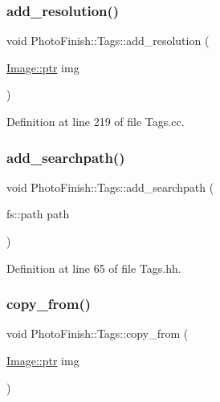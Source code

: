 \subsubsection{\texorpdfstring{add\+\_\+resolution()}{add\_resolution()}}
{\footnotesize\ttfamily void Photo\+Finish\+::\+Tags\+::add\+\_\+resolution (\begin{DoxyParamCaption}\item[{\hyperlink{class_photo_finish_1_1_image_ab336203305ed3a1397d7245063353b5a}{Image\+::ptr}}]{img }\end{DoxyParamCaption})}



Definition at line 219 of file Tags.\+cc.

\mbox{\label{class_photo_finish_1_1_tags_a643e1af1ed57a5cd8ad483ccbed1c190}} 
\subsubsection{\texorpdfstring{add\+\_\+searchpath()}{add\_searchpath()}}
{\footnotesize\ttfamily void Photo\+Finish\+::\+Tags\+::add\+\_\+searchpath (\begin{DoxyParamCaption}\item[{fs\+::path}]{path }\end{DoxyParamCaption})\hspace{0.3cm}{\ttfamily [inline]}}



Definition at line 65 of file Tags.\+hh.

\mbox{\label{class_photo_finish_1_1_tags_a55793c73da1d7c982bf8285f829bc80f}} 
\subsubsection{\texorpdfstring{copy\+\_\+from()}{copy\_from()}}
{\footnotesize\ttfamily void Photo\+Finish\+::\+Tags\+::copy\+\_\+from (\begin{DoxyParamCaption}\item[{\hyperlink{class_photo_finish_1_1_image_ab336203305ed3a1397d7245063353b5a}{Image\+::ptr}}]{img }\end{DoxyParamCaption})}



